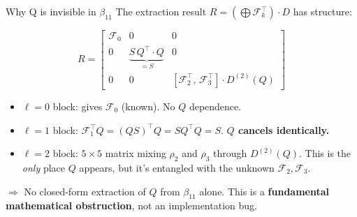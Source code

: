 \documentclass[aspectratio=169]{beamer}
\begin{document}
\begin{frame}{Why Q is invisible in $\beta_{11}$}
  The extraction result $R = (\bigoplus \mathcal{F}_k^\top) \cdot D$ has structure:

  \[
    R = \begin{bmatrix}
      \mathcal{F}_0 & 0 & 0 \\
      0 & \underbrace{S\,Q^\top \cdot Q}_{= S} & 0 \\
      0 & 0 & [\mathcal{F}_2^\top,\, \mathcal{F}_3^\top] \cdot D^{(2)}(Q)
    \end{bmatrix}
  \]

  \medskip

  \begin{itemize}
    \item $\ell{=}0$ block: gives $\mathcal{F}_0$ (known). No $Q$ dependence.
    \item $\ell{=}1$ block: $\mathcal{F}_1^\top Q = (QS)^\top Q = SQ^\top Q = S$.
          \textbf{$Q$ cancels identically.}
    \item $\ell{=}2$ block: $5\times 5$ matrix mixing $\rho_2$ and $\rho_3$ through $D^{(2)}(Q)$.
          This is the \emph{only} place $Q$ appears, but it's entangled with the unknown $\mathcal{F}_2, \mathcal{F}_3$.
  \end{itemize}

  \bigskip

  $\Rightarrow$ No closed-form extraction of $Q$ from $\beta_{11}$ alone.
  This is a \textbf{fundamental mathematical obstruction}, not an implementation bug.
\end{frame}
\end{document}
